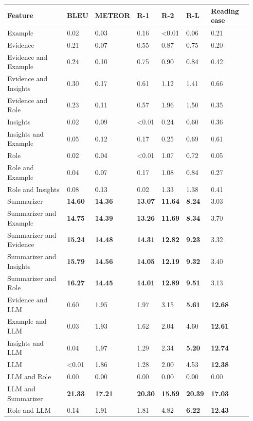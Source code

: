 \begin{tabular}{|l|l|l|l|l|l|l|}
\hline
\textbf{Feature} & BLEU & METEOR & R-1 & R-2 & R-L & Reading ease \\
 \hline
 Example & 0.02 & 0.03 & 0.16 & \textless{}0.01 & 0.06 & 0.21 \\
 \hline
 Evidence & 0.21 & 0.07 & 0.55 & 0.87 & 0.75 & 0.20 \\
 \hline
 Evidence and Example & 0.24 & 0.10 & 0.75 & 0.90 & 0.84 & 0.42 \\
 \hline
 Evidence and Insights & 0.30 & 0.17 & 0.61 & 1.12 & 1.41 & 0.66 \\
 \hline
 Evidence and Role & 0.23 & 0.11 & 0.57 & 1.96 & 1.50 & 0.35 \\
 \hline
 Insights & 0.02 & 0.09 & \textless{}0.01 & 0.24 & 0.60 & 0.36 \\
 \hline
 Insights and Example & 0.05 & 0.12 & 0.17 & 0.25 & 0.69 & 0.61 \\
 \hline
 Role & 0.02 & 0.04 & \textless{}0.01 & 1.07 & 0.72 & 0.05 \\
 \hline
 Role and Example & 0.04 & 0.07 & 0.17 & 1.08 & 0.84 & 0.27 \\
 \hline
 Role and Insights & 0.08 & 0.13 & 0.02 & 1.33 & 1.38 & 0.41 \\
 \hline
 Summarizer & \textbf{14.60} & \textbf{14.36} & \textbf{13.07} & \textbf{11.64} & \textbf{8.24} & 3.03 \\
 \hline
 Summarizer and Example & \textbf{14.75} & \textbf{14.39} & \textbf{13.26} & \textbf{11.69} & \textbf{8.34} & 3.70 \\
 \hline
 Summarizer and Evidence & \textbf{15.24} & \textbf{14.48} & \textbf{14.31} & \textbf{12.82} & \textbf{9.23} & 3.32 \\
 \hline
 Summarizer and Insights & \textbf{15.79} & \textbf{14.56} & \textbf{14.05} & \textbf{12.19} & \textbf{9.32} & 3.40 \\
 \hline
 Summarizer and Role & \textbf{16.27} & \textbf{14.45} & \textbf{14.01} & \textbf{12.89} & \textbf{9.51} & 3.13 \\
 \hline
 Evidence and LLM & 0.60 & 1.95 & 1.97 & 3.15 & \textbf{5.61} & \textbf{12.68} \\
 \hline
 Example and LLM & 0.03 & 1.93 & 1.62 & 2.04 & 4.60 & \textbf{12.61} \\
 \hline
 Insights and LLM & 0.04 & 1.97 & 1.29 & 2.34 & \textbf{5.20} & \textbf{12.74} \\
 \hline
 LLM & \textless{}0.01 & 1.86 & 1.28 & 2.00 & 4.53 & \textbf{12.38} \\
 \hline
 LLM and Role & 0.00 & 0.00 & 0.00 & 0.00 & 0.00 & 0.00 \\
 \hline
 LLM and Summarizer & \textbf{21.33} & \textbf{17.21} & \textbf{20.30} & \textbf{15.59} & \textbf{20.39} & \textbf{17.03} \\
 \hline
 Role and LLM & 0.14 & 1.91 & 1.81 & 4.82 & \textbf{6.22} & \textbf{12.43} \\
\hline
\end{tabular}
